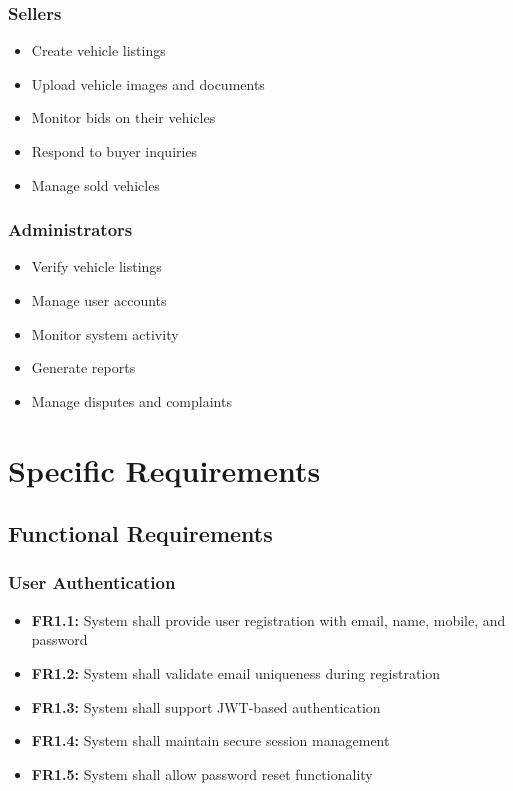\documentclass[12pt,a4paper]{report}
\begin{document}
\subsection{Sellers}
\begin{itemize}
    \item Create vehicle listings
    \item Upload vehicle images and documents
    \item Monitor bids on their vehicles
    \item Respond to buyer inquiries
    \item Manage sold vehicles
\end{itemize}

\subsection{Administrators}
\begin{itemize}
    \item Verify vehicle listings
    \item Manage user accounts
    \item Monitor system activity
    \item Generate reports
    \item Manage disputes and complaints
\end{itemize}

\chapter{Specific Requirements}

\section{Functional Requirements}

\subsection{User Authentication}
\begin{itemize}
    \item \textbf{FR1.1:} System shall provide user registration with email, name, mobile, and password
    \item \textbf{FR1.2:} System shall validate email uniqueness during registration
    \item \textbf{FR1.3:} System shall support JWT-based authentication
    \item \textbf{FR1.4:} System shall maintain secure session management
    \item \textbf{FR1.5:} System shall allow password reset functionality
\end{itemize}
\end{document}
